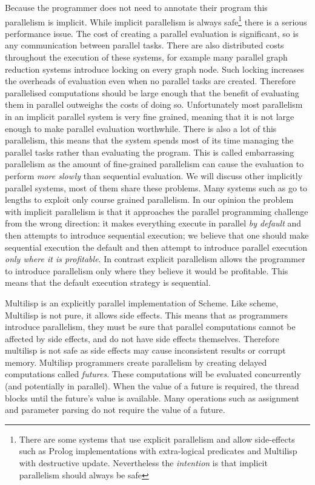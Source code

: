 Because the programmer does not need to annotate their program this
parallelism is implicit.
While implicit parallelism is always safe\footnote{
    There are some systems that use explicit parallelism and allow
    side-effects such as
    Prolog implementations with extra-logical predicates and
    Multilisp with destructive update. 
    Nevertheless the \emph{intention} is that implicit parallelism should
    always be safe}
there is a serious performance issue.
The cost of creating a parallel evaluation is significant,
so is any communication between parallel tasks.
There are also distributed costs throughout the execution of these systems,
for example many parallel graph reduction systems introduce locking on every
graph node.
Such locking increases the overheads of evaluation even when no parallel
tasks are created.
Therefore parallelised computations should be large enough that the benefit
of evaluating them in parallel outweighs the costs of doing so.
Unfortunately most parallelism in an implicit parallel system is very
fine grained, meaning that it is not large enough to make parallel
evaluation worthwhile.
There is also a lot of this parallelism,
this means that the system spends most of its time managing the parallel
tasks rather than evaluating the program.
This is called embarrassing parallelism as the amount of fine-grained
parallelism can cause the evaluation to perform \emph{more slowly} than
sequential evaluation.
We will discuss other implicitly parallel systems,
most of them share these problems.
Many systems such as \citet*{peyton-jones:1989:parallel-graph-reduction} go
to lengths to exploit only course grained parallelism.
In our opinion the problem with implicit parallelism is that it approaches
the parallel programming challenge from the wrong direction:
it makes everything execute in parallel \emph{by default} and then attempts
to introduce sequential execution;
we believe that one should make sequential execution the default and then
attempt to introduce parallel execution \emph{only where it is profitable}.
In contrast explicit parallelism allows the programmer to introduce
parallelism only where they believe it would be profitable.
This means that the default execution strategy is sequential.

Multilisp \citep{halstead:1984:multilisp,halstead:1985:multilisp} is an
explicitly parallel implementation of Scheme.
Like scheme, Multilisp is not pure, it allows side effects.
This means that as programmers introduce parallelism, they must be sure that
parallel computations cannot be affected by side effects,
and do not have side effects themselves.
Therefore multilisp is not safe as side effects may cause inconsistent
results or corrupt memory.
Multilisp programmers create parallelism by creating delayed computations
called \emph{futures}.
These computations will be evaluated concurrently
(and potentially in parallel).
When the value of a future is required,
the thread blocks until the future's value is available.
Many operations such as assignment and parameter parsing do not require the
value of a future.

